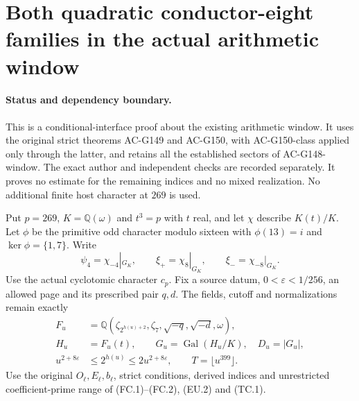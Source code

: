 \section{Both quadratic conductor-eight families in the actual arithmetic window}
\label{sec:quadratic8-actual-window}

\paragraph{Status and dependency boundary.}
This is a conditional-interface proof about the existing arithmetic
window.  It uses the original strict theorems AC-G149 and AC-G150,
with AC-G150-class applied only through the latter, and retains
all the established sectors of AC-G148-window.
The exact author and independent checks are recorded separately.
It proves no estimate for the remaining indices and no mixed
realization.  No additional finite host character at $269$ is used.

Put $p=269$, $K=\mathbb Q(\omega)$ and $t^3=p$ with $t$ real,
and let $\chi$ describe $K(t)/K$.
Let $\phi$ be the primitive odd character modulo sixteen with
$\phi(13)=i$ and $\ker\phi=\{1,7\}$.
Write
\[
 \psi_4=\chi_{-4}|_{G_K},\qquad
 \xi_+=\chi_8|_{G_K},\qquad \xi_-=\chi_{-8}|_{G_K}.
 \tag{Q8W.1}
\]
Use the actual cyclotomic character $c_p$.
Fix a source datum, $0<\varepsilon<1/256$, an allowed page and
its prescribed pair $q,d$.
The fields, cutoff and normalizations remain exactly
\[
 \begin{aligned}
 F_u&=\mathbb Q(\zeta_{2^{h(u)+2}},\zeta_7,
                         \sqrt{-q},\sqrt{-d},\omega),\\
 H_u&=F_u(t),\qquad G_u=\operatorname{Gal}(H_u/K),\quad D_u=|G_u|,\\
 u^{2+8\varepsilon}&\leq2^{h(u)}\leq2u^{2+8\varepsilon},
                   \qquad T=\lfloor u^{399}\rfloor.
 \end{aligned}
 \tag{Q8W.2}
\]
Use the original $O_\ell,E_\ell,b_\ell$, strict conditions,
derived indices and unrestricted coefficient-prime range of
(FC.1)--(FC.2), (EU.2) and (TC.1).

